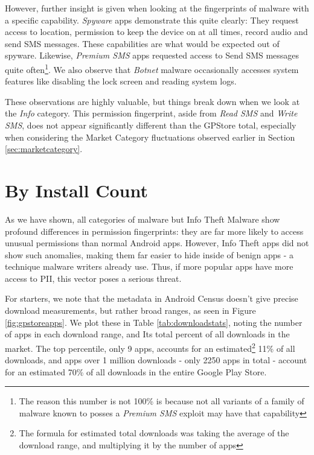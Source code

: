 However, further insight is given when looking at the fingerprints of malware with a specific capability. \textit{Spyware} apps demonstrate this quite clearly: They request access to location, permission to keep the device on at all times, record audio and send SMS messages. These capabilities are what would be expected out of spyware. Likewise, \textit{Premium SMS} apps requested access to Send SMS messages quite often\footnote{The reason this number is not 100\% is because not all variants of a family of malware known to posses a \textit{Premium SMS} exploit may have that capability}. We also observe that \textit{Botnet} malware occasionally accesses system features like disabling the lock screen and reading system logs.

These observations are highly valuable, but things break down when we look at the \textit{Info} category. This permission fingerprint, aside from \textit{Read SMS} and \textit{Write SMS}, does not appear significantly different than the GPStore total, especially when considering the Market Category fluctuations observed earlier in Section \ref{sec:marketcategory}. 


\section{By Install Count}
As we have shown, all categories of malware but Info Theft Malware show profound differences in permission fingerprints: they are far more likely to access unusual permissions than normal Android apps. However, Info Theft apps did not show such anomalies, making them far easier to hide inside of benign apps - a technique malware writers already use\citep{avastfakeapps}. Thus, if more popular apps have more access to PII, this vector poses a serious threat.

For starters, we note that the metadata in Android Census doesn't give precise download measurements, but rather broad ranges, as seen in Figure \ref{fig:gpstoreapps}. We plot these in Table \ref{tab:downloadstats}, noting the number of apps in each download range, and Its total percent of all downloads in the market. The top percentile, only 9 apps, accounts for an estimated\footnote{The formula for estimated total downloads was taking the average of the download range, and multiplying it by the number of apps} 11\% of all downloads, and apps over 1 million downloads - only 2250 apps in total - account for an estimated 70\% of all downloads in the entire Google Play Store.

